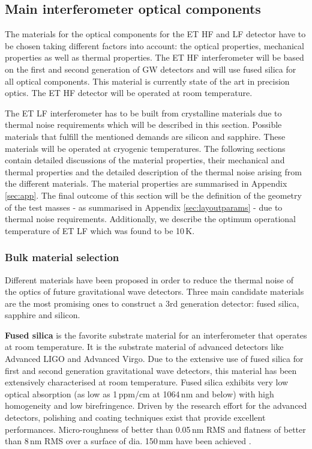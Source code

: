\FloatBarrier
\subsection{Main interferometer optical components}\label{sec:optcomps}

The materials for the optical components for the ET HF and LF detector have to be chosen taking different factors into account: the optical properties, mechanical properties as well as thermal properties. The ET HF interferometer will be based on the first and second generation of GW detectors and will use fused silica for all optical components. This material is currently state of the art in precision optics. The ET HF detector will be operated at room temperature.

The ET LF interferometer has to be built from crystalline materials due to thermal noise requirements which will be described in this section. Possible materials that fulfill the mentioned demands are silicon and sapphire. These materials will be operated at cryogenic temperatures. The following sections contain detailed discussions of the material properties, their mechanical and thermal properties and the detailed description of the thermal noise arising from the different materials. The material properties are summarised in Appendix\,\ref{sec:app}. The final outcome of this section will be the definition of the geometry of the test masses - as summarised in Appendix \ref{sec:layoutparams} - due to thermal noise requirements. Additionally, we describe the optimum operational temperature of ET LF which was found to be 10\,K.

\FloatBarrier
\subsubsection{Bulk material selection}
\label{sec:material}


Different materials have been proposed in order to reduce the thermal noise of the optics of future gravitational wave detectors. Three main candidate materials are the most promising ones to construct a 3rd generation detector: fused silica, sapphire and silicon.

{\bf Fused silica} is the favorite substrate material for an interferometer that operates at room temperature. It is the substrate material of advanced detectors like Advanced LIGO and Advanced Virgo. Due to the extensive use of fused silica for first and second generation gravitational wave detectors, this material has been extensively characterised at room temperature. Fused silica exhibits very low optical absorption (as low as 1\,ppm/cm at 1064\,nm and below) with high homogeneity and low birefringence. Driven by the research effort for the advanced detectors, polishing and coating techniques exist that provide excellent performances. Micro-roughness of better than 0.05\,nm RMS and flatness of better than 8\,nm RMS over a surface of dia. 150\,mm have been achieved \cite{Mackowski2005}.

